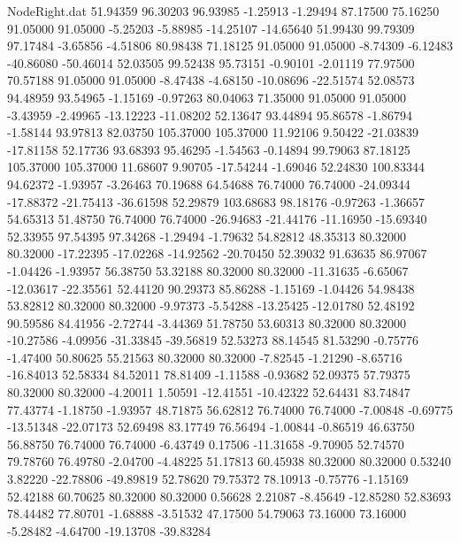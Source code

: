 \begin{filecontents}{NodeRight.dat}
  51.94359   96.30203   96.93985    -1.25913   -1.29494   87.17500   75.16250   91.05000   91.05000   -5.25203   -5.88985  -14.25107  -14.65640
  51.99430   99.79309   97.17484    -3.65856   -4.51806   80.98438   71.18125   91.05000   91.05000   -8.74309   -6.12483  -40.86080  -50.46014
  52.03505   99.52438   95.73151    -0.90101   -2.01119   77.97500   70.57188   91.05000   91.05000   -8.47438   -4.68150  -10.08696  -22.51574
  52.08573   94.48959   93.54965    -1.15169   -0.97263   80.04063   71.35000   91.05000   91.05000   -3.43959   -2.49965  -13.12223  -11.08202
  52.13647   93.44894   95.86578    -1.86794   -1.58144   93.97813   82.03750  105.37000  105.37000   11.92106    9.50422  -21.03839  -17.81158
  52.17736   93.68393   95.46295    -1.54563   -0.14894   99.79063   87.18125  105.37000  105.37000   11.68607    9.90705  -17.54244   -1.69046
  52.24830  100.83344   94.62372    -1.93957   -3.26463   70.19688   64.54688   76.74000   76.74000  -24.09344  -17.88372  -21.75413  -36.61598
  52.29879  103.68683   98.18176    -0.97263   -1.36657   54.65313   51.48750   76.74000   76.74000  -26.94683  -21.44176  -11.16950  -15.69340
  52.33955   97.54395   97.34268    -1.29494   -1.79632   54.82812   48.35313   80.32000   80.32000  -17.22395  -17.02268  -14.92562  -20.70450
  52.39032   91.63635   86.97067    -1.04426   -1.93957   56.38750   53.32188   80.32000   80.32000  -11.31635   -6.65067  -12.03617  -22.35561
  52.44120   90.29373   85.86288    -1.15169   -1.04426   54.98438   53.82812   80.32000   80.32000   -9.97373   -5.54288  -13.25425  -12.01780
  52.48192   90.59586   84.41956    -2.72744   -3.44369   51.78750   53.60313   80.32000   80.32000  -10.27586   -4.09956  -31.33845  -39.56819
  52.53273   88.14545   81.53290    -0.75776   -1.47400   50.80625   55.21563   80.32000   80.32000   -7.82545   -1.21290   -8.65716  -16.84013
  52.58334   84.52011   78.81409    -1.11588   -0.93682   52.09375   57.79375   80.32000   80.32000   -4.20011    1.50591  -12.41551  -10.42322
  52.64431   83.74847   77.43774    -1.18750   -1.93957   48.71875   56.62812   76.74000   76.74000   -7.00848   -0.69775  -13.51348  -22.07173
  52.69498   83.17749   76.56494    -1.00844   -0.86519   46.63750   56.88750   76.74000   76.74000   -6.43749    0.17506  -11.31658   -9.70905
  52.74570   79.78760   76.49780    -2.04700   -4.48225   51.17813   60.45938   80.32000   80.32000    0.53240    3.82220  -22.78806  -49.89819
  52.78620   79.75372   78.10913    -0.75776   -1.15169   52.42188   60.70625   80.32000   80.32000    0.56628    2.21087   -8.45649  -12.85280
  52.83693   78.44482   77.80701    -1.68888   -3.51532   47.17500   54.79063   73.16000   73.16000   -5.28482   -4.64700  -19.13708  -39.83284

\end{filecontents}
